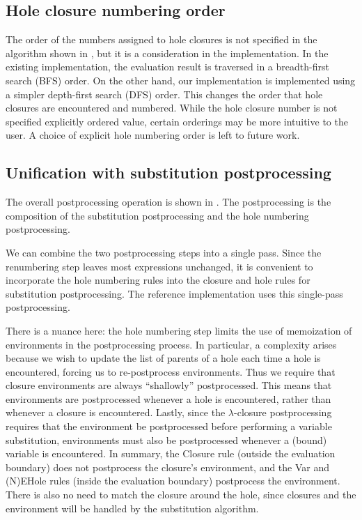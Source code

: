 \subsection{Hole closure numbering order}
\label{sec:numbering-order}

The order of the numbers assigned to hole closures is not specified in the algorithm shown in , but it is a consideration in the implementation. In the existing implementation, the evaluation result is traversed in a breadth-first search (BFS) order. On the other hand, our implementation is implemented using a simpler depth-first search (DFS) order. This changes the order that hole closures are encountered and numbered. While the hole closure number is not specified explicitly ordered value, certain orderings may be more intuitive to the user. A choice of explicit hole numbering order is left to future work.

\subsection{Unification with substitution postprocessing}
\label{sec:unification-postprocessing}

The overall postprocessing operation is shown in . The postprocessing is the composition of the substitution postprocessing and the hole numbering postprocessing.

We can combine the two postprocessing steps into a single pass. Since the renumbering step leaves most expressions unchanged, it is convenient to incorporate the hole numbering rules into the closure and hole rules for substitution postprocessing. The reference implementation uses this single-pass postprocessing.

There is a nuance here: the hole numbering step limits the use of memoization of environments in the postprocessing process. In particular, a complexity arises because we wish to update the list of parents of a hole each time a hole is encountered, forcing us to re-postprocess environments. Thus we require that closure environments are always ``shallowly'' postprocessed. This means that environments are postprocessed whenever a hole is encountered, rather than whenever a closure is encountered. Lastly, since the $\lambda$-closure postprocessing requires that the environment be postprocessed before performing a variable substitution, environments must also be postprocessed whenever a (bound) variable is encountered. In summary, the \pplcl{}Closure rule (outside the evaluation boundary) does not postprocess the closure's environment, and the \pplcl{}Var and \pplcl{}(N)EHole rules (inside the evaluation boundary) postprocess the environment. There is also no need to match the closure around the hole, since closures and the environment will be handled by the substitution algorithm.

